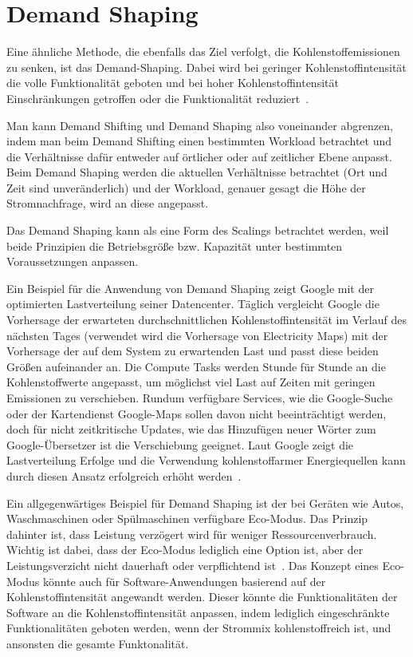 \section{Demand Shaping}
Eine ähnliche Methode, die ebenfalls das Ziel verfolgt, die Kohlenstoffemissionen zu senken, ist das Demand-Shaping.
Dabei wird bei geringer Kohlenstoffintensität die volle Funktionalität geboten und bei hoher Kohlenstoffintensität Einschränkungen getroffen oder die Funktionalität reduziert~\cite{Currie.2024}.

Man kann Demand Shifting und Demand Shaping also voneinander abgrenzen, indem man beim Demand Shifting einen bestimmten Workload betrachtet und die Verhältnisse dafür entweder auf örtlicher oder auf zeitlicher Ebene anpasst.
Beim Demand Shaping werden die aktuellen Verhältnisse betrachtet (Ort und Zeit sind unveränderlich) und der Workload, genauer gesagt die Höhe der Stromnachfrage, wird an diese angepasst.

Das Demand Shaping kann als eine Form des Scalings betrachtet werden, weil beide Prinzipien die Betriebsgröße bzw. Kapazität unter bestimmten Voraussetzungen anpassen.

Ein Beispiel für die Anwendung von Demand Shaping zeigt Google mit der optimierten Lastverteilung seiner Datencenter.
Täglich vergleicht Google die Vorhersage der erwarteten durchschnittlichen Kohlenstoffintensität im Verlauf des nächsten Tages (verwendet wird die Vorhersage von Electricity Maps) mit der Vorhersage der auf dem System zu erwartenden Last und passt diese beiden Größen aufeinander an.
Die Compute Tasks werden Stunde für Stunde an die Kohlenstoffwerte angepasst, um möglichst viel Last auf Zeiten mit geringen Emissionen zu verschieben.
Rundum verfügbare Services, wie die Google-Suche oder der Kartendienst Google-Maps sollen davon nicht beeinträchtigt werden, doch für nicht zeitkritische Updates, wie das Hinzufügen neuer Wörter zum Google-Übersetzer ist die Verschiebung geeignet.
Laut Google zeigt die Lastverteilung Erfolge und die Verwendung kohlenstoffarmer Energiequellen kann durch diesen Ansatz erfolgreich erhöht werden~\cite{Radovanovic.22.4.2020}.

Ein allgegenwärtiges Beispiel für Demand Shaping ist der bei Geräten wie Autos, Waschmaschinen oder Spülmaschinen verfügbare Eco-Modus.
Das Prinzip dahinter ist, dass Leistung verzögert wird für weniger Ressourcenverbrauch.
Wichtig ist dabei, dass der Eco-Modus lediglich eine Option ist, aber der Leistungsverzicht nicht dauerhaft oder verpflichtend ist~\cite{GreenSoftwareFoundation.2022}.
Das Konzept eines Eco-Modus könnte auch für Software-Anwendungen basierend auf der Kohlenstoffintensität angewandt werden.
Dieser könnte die Funktionalitäten der Software an die Kohlenstoffintensität anpassen, indem lediglich eingeschränkte Funktionalitäten geboten werden, wenn der Strommix \glqq kohlenstoffreich\grqq{} ist, und ansonsten die gesamte Funktonalität.

